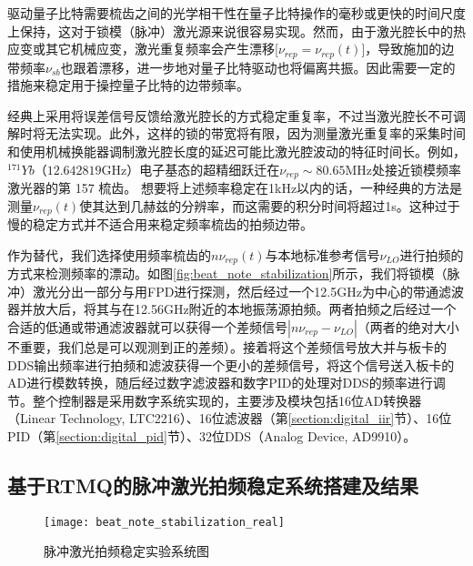 驱动量子比特需要梳齿之间的光学相干性在量子比特操作的毫秒或更快的时间尺度上保持，这对于锁模（脉冲）激光源来说很容易实现\cite[]{Hayes_Matsukevich_Maunz_Hucul_Quraishi_Olmschenk_Campbell_Mizrahi_Senko_Monroe_2010}。然而，由于激光腔长中的热应变或其它机械应变，激光重复频率会产生漂移[$\nu_{rep}=\nu_{rep}(t)$]，导致施加的边带频率$\nu_{sb}$也跟着漂移，进一步地对量子比特驱动也将偏离共振。因此需要一定的措施来稳定用于操控量子比特的边带频率。

经典上采用将误差信号反馈给激光腔长的方式稳定重复率，不过当激光腔长不可调解时将无法实现。此外，这样的锁的带宽将有限，因为测量激光重复率的采集时间和使用机械换能器调制激光腔长度的延迟可能比激光腔波动的特征时间长。例如，$^{171}Yb$（$12.642819 $GHz）电子基态的超精细跃迁在$ \nu_{rep} \sim 80.65$MHz处接近锁模频率激光器的第 157 梳齿。
想要将上述频率稳定在1kHz以内的话，一种经典的方法是测量$\nu_{rep}(t)$使其达到几赫兹的分辨率，而这需要的积分时间将超过1s。这种过于慢的稳定方式并不适合用来稳定频率梳齿的拍频边带。

作为替代，我们选择使用频率梳齿的$n\nu_{rep}(t)$与本地标准参考信号$\nu_{LO}$进行拍频的方式来检测频率的漂动。如图\ref{fig:beat_note_stabilization}所示，我们将锁模（脉冲）激光分出一部分与用FPD进行探测，然后经过一个12.5GHz为中心的带通滤波器并放大后，将其与在12.56GHz附近的本地振荡源拍频。两者拍频之后经过一个合适的低通或带通滤波器就可以获得一个差频信号$|n\nu_{rep}-\nu_{LO}|$（两者的绝对大小不重要，我们总是可以观测到正的差频）。接着将这个差频信号放大并与板卡的DDS输出频率进行拍频和滤波获得一个更小的差频信号，将这个信号送入板卡的AD进行模数转换，随后经过数字滤波器和数字PID的处理对DDS的频率进行调节。整个控制器是采用数字系统实现的，主要涉及模块包括16位AD转换器（Linear Technology, LTC2216）、16位滤波器（第\ref{section:digital_iir}节）、16位PID（第\ref{section:digital_pid}节）、32位DDS（Analog Device, AD9910）。



\subsection[基于RTMQ的脉冲激光拍频稳定系统搭建及结果]{基于RTMQ的脉冲激光拍频稳定系统搭建及结果}


\begin{figure}
    \centering
    \caption[脉冲激光拍频稳定实验系统图]{脉冲激光拍频稳定实验系统图\label{fig:beat_note_stabilization_real}}
    \texttt{[image: beat\_note\_stabilization\_real]}
\end{figure}

